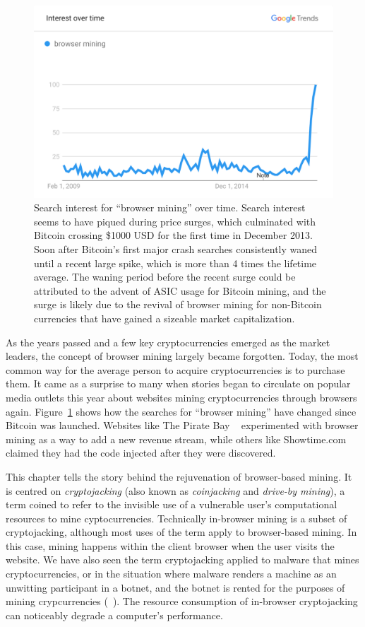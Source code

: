 \begin{figure}[t]
\centering
\includegraphics[width=0.9\linewidth]{figures/browser_mining.png}
\caption[Browser Mining Search Interest]{Search interest for ``browser mining'' over time. Search interest seems to have piqued during price surges, which culminated with Bitcoin crossing \$1000 USD for the first time in December 2013. Soon after Bitcoin's first major crash searches consistently waned until a recent large spike, which is more than 4 times the lifetime average. The waning period before the recent surge could be attributed to the advent of ASIC usage for Bitcoin mining, and the surge is likely due to the revival of browser mining for non-Bitcoin currencies that have gained a sizeable market capitalization.\label{fig:interest}}
\end{figure}

As the years passed and a few key cryptocurrencies emerged as the market leaders, the concept of browser mining largely became forgotten. Today, the most common way for the average person to acquire cryptocurrencies is to purchase them. It came as a surprise to many when stories began to circulate on popular media outlets this year about websites mining cryptocurrencies through browsers again. Figure~\ref{fig:interest} shows how the searches for ``browser mining'' have changed since Bitcoin was launched. Websites like The Pirate Bay ~\cite{piratesbayhive} experimented with browser mining as a way to add a new revenue stream, while others like Showtime.com ~\cite{showtimehive} claimed they had the code injected after they were discovered. 

This chapter tells the story behind the rejuvenation of browser-based mining. It is centred on \textit{cryptojacking} (also known as \textit{coinjacking} and \textit{drive-by mining}), a term coined to refer to the invisible use of a vulnerable user's computational resources to mine cyptocurrencies. Technically in-browser mining is a subset of cryptojacking, although most uses of the term apply to browser-based mining. In this case, mining happens within the client browser when the user visits the website. We have also seen the term cryptojacking applied to malware that mines cryptocurrencies, or in the situation where malware renders a machine as an unwitting participant in a botnet, and the botnet is rented for the purposes of mining crypcurrencies (\cf~\cite{huang2014botcoin}). The resource consumption of in-browser cryptojacking can noticeably degrade a computer's performance.

